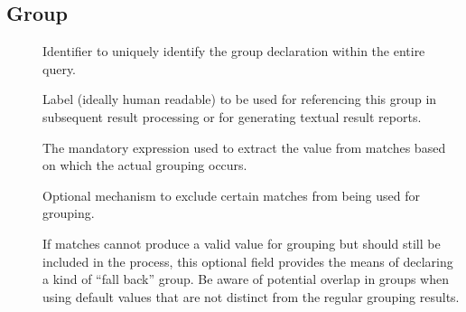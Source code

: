 \documentclass[11pt,a4paper]{article}
\begin{document}
\subsection{Group}
\label{sec:json-ld-group}
\begin{attributes}{}
\end{attributes}
\begin{description}
	\item[] Identifier to uniquely identify the group declaration within the entire query.
	\item[] Label (ideally human readable) to be used for referencing this group in subsequent result processing or for generating textual result reports.
\end{description}
\begin{elements}{}
\end{elements}
\begin{description}
	\item[] The mandatory expression used to extract the value from matches based on which the actual grouping occurs.
	\item[] Optional mechanism to exclude certain matches from being used for grouping.
	\item[] If matches cannot produce a valid value for grouping but should still be included in the process, this optional field provides the means of declaring a kind of ``fall back'' group. Be aware of potential overlap in groups when using default values that are not distinct from the regular grouping results.
\end{description}
\end{document}
